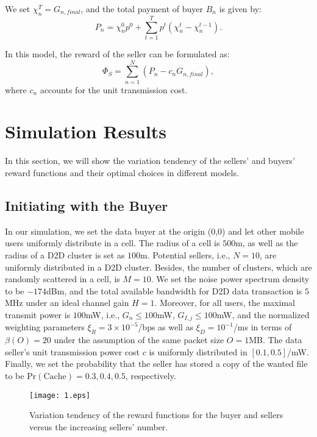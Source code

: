 \documentclass[11pt,draftcls]{IEEEtran}{\onecolumn}
\begin{document}
We set $\chi_n^{T}=G_{n,final}$, and the total payment of buyer $B_n$ is given by:
\begin{equation}
P_n=\chi_n^0p^0+\sum_{t=1}^{T} p^t\left(\chi_n^t-\chi_n^{t-1}\right).
\end{equation}

In this model, the reward of the seller can be formulated as:
\begin{equation}
\Phi_{S}=\sum_{n=1}^N{\left(P_n-c_n G_{n,final}\right)},
\end{equation}
where $c_n$ accounts for the unit transmission cost.

\section{Simulation Results}

In this section, we will show the variation tendency of the sellers' and buyers' reward functions and their optimal choices in different models.

\subsection{Initiating with the Buyer}

In our simulation, we set the data buyer at the origin (0,0) and let other mobile users uniformly distribute in a cell. The radius of a cell is $500$m, as well as the radius of a D2D cluster is set as $100$m. Potential sellers, i.e., $N=10$, are uniformly distributed in a D2D cluster. Besides, the number of clusters, which are randomly scattered in a cell, is $M=10$. We set the noise power spectrum density to be $-174$dBm, and the total available bandwidth for D2D data transaction is $5$MHz under an ideal channel gain $H=1$. Moreover, for all users, the maximal transmit power is $100$mW, i.e., $G_{n}\leq 100$mW, $G_{I,j}\leq 100$mW, and the normalized weighting parameters $\xi_R=3\times10^{-5}$/bps as well as $\xi_D=10^{-1}$/ms in terms of $\beta(O)=20$ under the assumption of the same packet size $O=1$MB. The data seller's unit transmission power cost $c$ is uniformly distributed in $[0.1, 0.5]$/mW. Finally, we set the probability that the seller has stored a copy of the wanted file to be $\textrm{Pr}(\textrm{Cache})=0.3, 0.4, 0.5$, respectively.


\begin{figure}
\begin{center}
\texttt{[image: 1.eps]}
\end{center}
\caption{Variation tendency of the reward functions for the buyer and sellers versus the increasing sellers' number.}\label{MultipleU}
\end{figure}
\end{document}
